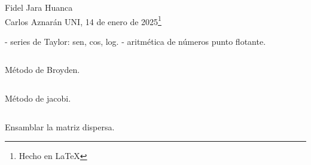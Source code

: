 \vfill{\noindent Fidel Jara Huanca\\Carlos Aznarán
}
\hfill{UNI, 14 de enero de 2025\footnote{Hecho en \LaTeX}}



- series de Taylor: sen, cos, log.
- aritmética de números punto flotante.


\begin{listing}[ht!]
    \tiny
    \centering
    \inputminted[linenos,highlightlines={5-16}]{octave}{broyden2.m}
    \caption{Método de Broyden.}
\end{listing}

\begin{listing}[ht!]
    \tiny
    \centering
    \inputminted[linenos,highlightlines={5-15}]{octave}{jacobi.m}
    \caption{Método de jacobi.}
\end{listing}

\begin{listing}[ht!]
    \tiny
    \centering
    \inputminted[linenos,highlightlines={4-20}]{octave}{sparsesetup.m}
    \caption{Ensamblar la matriz dispersa.}
\end{listing}
